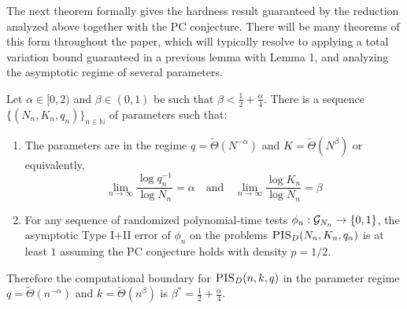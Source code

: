 \documentclass[11pt]{article}
\begin{document}
The next theorem formally gives the hardness result guaranteed by the reduction analyzed above together with the PC conjecture. There will be many theorems of this form throughout the paper, which will typically resolve to applying a total variation bound guaranteed in a previous lemma with Lemma 1, and analyzing the asymptotic regime of several parameters.

\begin{theorem}
Let $\alpha \in [0, 2)$ and $\beta \in (0, 1)$ be such that $\beta < \frac{1}{2} + \frac{\alpha}{4}$. There is a sequence $\{ (N_n, K_n, q_n) \}_{n \in \mathbb{N}}$ of parameters such that:
\begin{enumerate}
\item The parameters are in the regime $q = \tilde{\Theta}(N^{-\alpha})$ and $K = \tilde{\Theta}(N^\beta)$ or equivalently,
$$\lim_{n \to \infty} \frac{\log q_n^{-1}}{\log N_n} = \alpha \quad \text{and} \quad \lim_{n \to \infty} \frac{\log K_n}{\log N_n} = \beta$$
\item For any sequence of randomized polynomial-time tests $\phi_n : \mathcal{G}_{N_n} \to \{0, 1\}$, the asymptotic Type I$+$II error of $\phi_n$ on the problems $\textsc{PIS}_D(N_n, K_n, q_n)$ is at least $1$ assuming the PC conjecture holds with density $p = 1/2$.
\end{enumerate}
Therefore the computational boundary for $\textsc{PIS}_D(n, k, q)$ in the parameter regime $q = \tilde{\Theta}(n^{-\alpha})$ and $k = \tilde{\Theta}(n^\beta)$ is $\beta^* = \frac{1}{2} + \frac{\alpha}{4}$.
\end{theorem}
\end{document}
